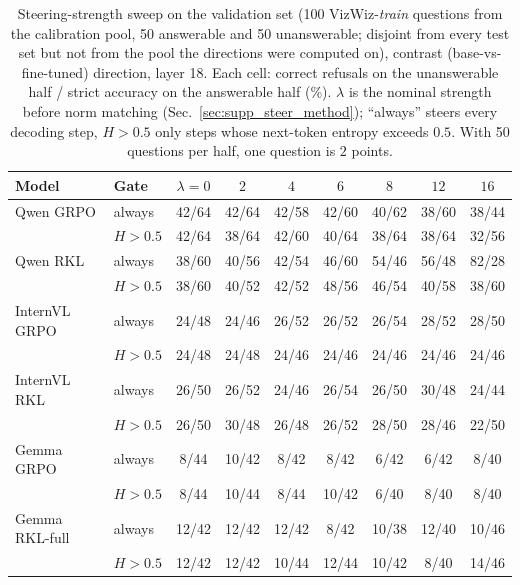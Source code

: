 \begin{table}[t]
\centering\small
\setlength{\tabcolsep}{3.5pt}
\begin{tabular}{llccccccc}
\toprule
Model & Gate & $\lambda{=}0$ & $2$ & $4$ & $6$ & $8$ & $12$ & $16$ \\
\midrule
Qwen GRPO & always & 42/64 & 42/64 & 42/58 & 42/60 & 40/62 & 38/60 & 38/44 \\
 & $H{>}0.5$ & 42/64 & 38/64 & 42/60 & 40/64 & 38/64 & 38/64 & 32/56 \\
\midrule
Qwen RKL & always & 38/60 & 40/56 & 42/54 & 46/60 & 54/46 & 56/48 & 82/28 \\
 & $H{>}0.5$ & 38/60 & 40/52 & 42/52 & 48/56 & 46/54 & 40/58 & 38/60 \\
\midrule
InternVL GRPO & always & 24/48 & 24/46 & 26/52 & 26/52 & 26/54 & 28/52 & 28/50 \\
 & $H{>}0.5$ & 24/48 & 24/48 & 24/46 & 24/46 & 24/46 & 24/46 & 24/46 \\
\midrule
InternVL RKL & always & 26/50 & 26/52 & 24/46 & 26/54 & 26/50 & 30/48 & 24/44 \\
 & $H{>}0.5$ & 26/50 & 30/48 & 26/48 & 26/52 & 28/50 & 28/46 & 22/50 \\
\midrule
Gemma GRPO & always & 8/44 & 10/42 & 8/42 & 8/42 & 6/42 & 6/42 & 8/40 \\
 & $H{>}0.5$ & 8/44 & 10/44 & 8/44 & 10/42 & 6/40 & 8/40 & 8/40 \\
\midrule
Gemma RKL-full & always & 12/42 & 12/42 & 12/42 & 8/42 & 10/38 & 12/40 & 10/46 \\
 & $H{>}0.5$ & 12/42 & 12/42 & 10/44 & 12/44 & 10/42 & 8/40 & 14/46 \\
\bottomrule
\end{tabular}
\caption{Steering-strength sweep on the validation set (100 VizWiz-\emph{train} questions from the calibration pool, 50 answerable and 50 unanswerable; disjoint from every test set but not from the pool the directions were computed on), contrast (base-vs-fine-tuned) direction, layer 18. Each cell: correct refusals on the unanswerable half / strict accuracy on the answerable half (\%). $\lambda$ is the nominal strength before norm matching (Sec.~\ref{sec:supp_steer_method}); ``always'' steers every decoding step, $H{>}0.5$ only steps whose next-token entropy exceeds $0.5$. With 50 questions per half, one question is $2$ points.}
\label{tab:supp_steer_val_contrast}
\end{table}

